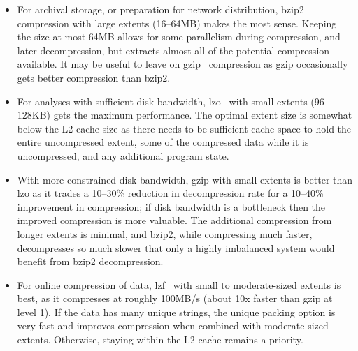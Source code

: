 \documentclass{acm_proc_article-sp}
\begin{document}
\begin{itemize}

\item For archival storage, or preparation for network distribution,
bzip2~\cite{BZIP} compression with large extents (16--64MB) makes the
most sense.  Keeping the size at most 64MB allows for some parallelism
during compression, and later decompression, but extracts almost all
of the potential compression available.  It may be useful to leave on
gzip~\cite{GZIP} compression 
as gzip occasionally gets better compression than
bzip2.

\item For analyses with sufficient disk bandwidth, lzo~\cite{LZO} with
small extents (96--128KB) gets the maximum performance.  The optimal
extent size is somewhat below the L2 cache size as there needs to be
sufficient cache space to hold the entire uncompressed extent, some of
the compressed data while it is uncompressed, and any additional
program state.

\item With more constrained disk bandwidth, gzip
with
small extents is better than lzo as it trades a 10--30\% reduction in
decompression rate for a 10--40\% improvement in compression; if disk
bandwidth is a 
bottleneck then the improved compression is more valuable.
The additional compression from longer extents is minimal, and bzip2,
while compressing much faster, decompresses so much slower that only a
highly imbalanced system would benefit from bzip2 decompression.

\item For online compression of data, lzf~\cite{LZF} with small to
moderate-sized extents is 
best, as it compresses at roughly 100MB/s (about 10x
faster than gzip at level 1).
If the data has many unique strings, the unique packing option
is very fast and improves compression when combined with 
moderate-sized extents.
Otherwise, staying within the L2 cache remains a priority.
\end{itemize}
\end{document}
